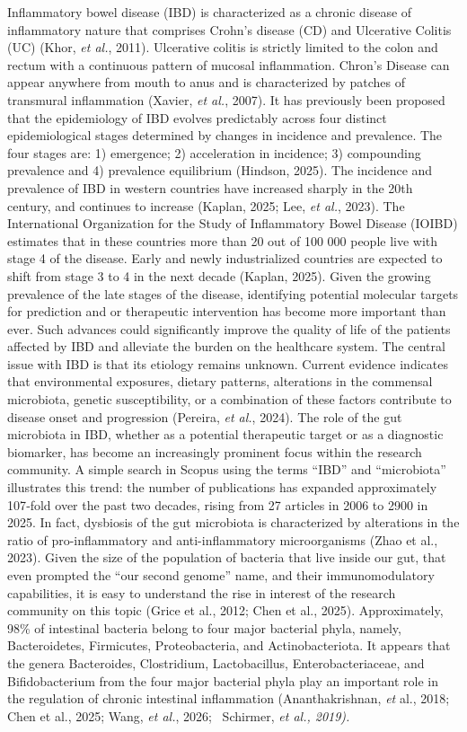 \documentclass[twoside,twocolumn,10pt]{article}
\begin{document}
Inflammatory bowel disease (IBD) is characterized as a chronic disease of inflammatory nature that comprises Crohn's disease (CD) and Ulcerative Colitis (UC) (Khor, \textit{et al.}, 2011). Ulcerative colitis is strictly limited to the colon and rectum with a continuous pattern of mucosal inflammation. Chron’s Disease can appear anywhere from mouth to anus and is characterized by patches of transmural inflammation (Xavier, \textit{et al.}, 2007). It has previously been proposed that the epidemiology of IBD evolves predictably across four distinct epidemiological stages determined by changes in incidence and prevalence. The four stages are: 1) emergence; 2) acceleration in incidence; 3) compounding prevalence and 4) prevalence equilibrium (Hindson, 2025). The incidence and prevalence of IBD in western countries have increased sharply in the 20th century, and continues to increase (Kaplan, 2025; Lee, \textit{et al.}, 2023). The International Organization for the Study of Inflammatory Bowel Disease (IOIBD) estimates that in these countries more than 20 out of 100 000 people live with stage 4 of the disease. Early and newly industrialized countries are expected to shift from stage 3 to 4 in the next decade (Kaplan, 2025). Given the growing prevalence of the late stages of the disease, identifying potential molecular targets for prediction and or therapeutic intervention has become more important than ever. Such advances could significantly improve the quality of life of the patients affected by IBD and alleviate the burden on the healthcare system. The central issue with IBD is that its etiology remains unknown. Current evidence indicates that environmental exposures, dietary patterns, alterations in the commensal microbiota, genetic susceptibility, or a combination of these factors contribute to disease onset and progression (Pereira, \textit{et al.}, 2024). The role of the gut microbiota in IBD, whether as a potential therapeutic target or as a diagnostic biomarker, has become an increasingly prominent focus within the research community. A simple search in Scopus using the terms “IBD” and “microbiota” illustrates this trend: the number of publications has expanded approximately 107‑fold over the past two decades, rising from 27 articles in 2006 to 2900 in 2025. In fact, dysbiosis of the gut microbiota is characterized by alterations in the ratio of pro-inflammatory and anti-inflammatory microorganisms (Zhao et al., 2023). Given the size of the population of bacteria that live inside our gut, that even prompted the “our second genome” name, and their immunomodulatory capabilities, it is easy to understand the rise in interest of the research community on this topic (Grice et al., 2012; Chen et al., 2025). Approximately, 98\% of intestinal bacteria belong to four major bacterial phyla, namely, Bacteroidetes, Firmicutes, Proteobacteria, and Actinobacteriota. It appears that the genera Bacteroides, Clostridium, Lactobacillus, Enterobacteriaceae, and Bifidobacterium from the four major bacterial phyla play an important role in the regulation of chronic intestinal inflammation (Ananthakrishnan, \textit{et }al., 2018; Chen et al., 2025; Wang, \textit{et al.}, 2026;  Schirmer, \textit{et al., 2019). }
\end{document}

